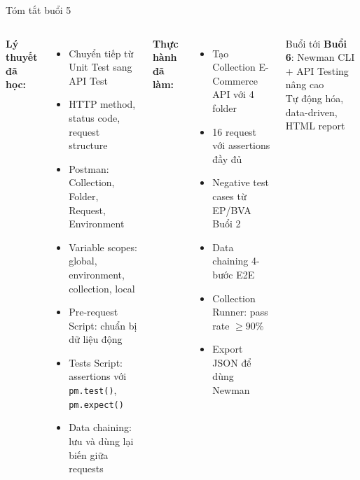 \documentclass[aspectratio=169,10pt]{beamer}
\begin{document}
\begin{frame}{Tóm tắt buổi 5}
  \begin{columns}
    \textbf{Lý thuyết đã học:}
    \begin{itemize}
      \item Chuyển tiếp từ Unit Test sang API Test
      \item HTTP method, status code, request structure
      \item Postman: Collection, Folder, Request, Environment
      \item Variable scopes: global, environment, collection, local
      \item Pre-request Script: chuẩn bị dữ liệu động
      \item Tests Script: assertions với \texttt{pm.test()}, \texttt{pm.expect()}
      \item Data chaining: lưu và dùng lại biến giữa requests
    \end{itemize}

    \textbf{Thực hành đã làm:}
    \begin{itemize}
      \item Tạo Collection E-Commerce API với 4 folder
      \item 16 request với assertions đầy đủ
      \item Negative test cases từ EP/BVA Buổi 2
      \item Data chaining 4-bước E2E
      \item Collection Runner: pass rate $\geq 90\%$
      \item Export JSON để dùng Newman
    \end{itemize}

    \vspace{0.3em}
    \begin{block}{Buổi tới}
      \textbf{Buổi 6}: Newman CLI + API Testing nâng cao\\
      Tự động hóa, data-driven, HTML report
    \end{block}
  \end{columns}
\end{frame}
\end{document}

